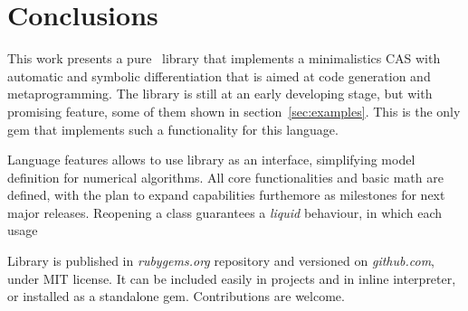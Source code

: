 
\section{Conclusions}
\label{sec:conclusions}

This work presents a pure \Ruby~library that implements a minimalistics CAS with
automatic and symbolic differentiation that is aimed at code generation and metaprogramming.
The library is still at an early developing stage, but with promising feature, some of them
shown in section~\ref{sec:examples}. This is the only gem that implements
such a functionality for this language.

Language features allows to use library as an interface, simplifying model definition
for numerical algorithms. All core functionalities and basic math are defined, with the plan to expand
capabilities furthemore as milestones for next major releases. Reopening a class guarantees a
\emph{liquid} behaviour, in which each usage

Library is published in \emph{rubygems.org} repository and versioned on \emph{github.com}, under MIT license.
It can be included easily in projects and in inline interpreter, or installed as a standalone gem. Contributions are welcome.
